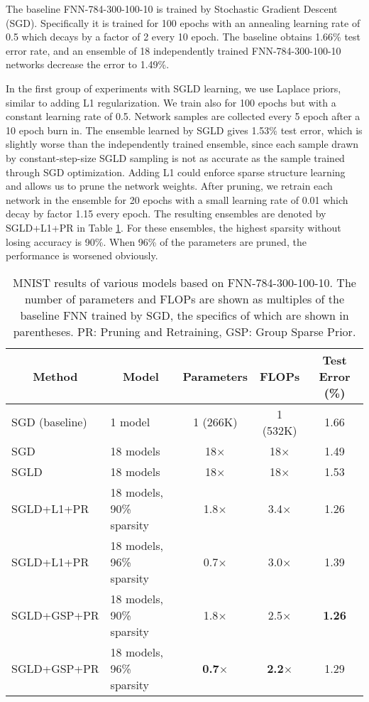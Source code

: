 \documentclass{article} %
\begin{document}
The baseline FNN-784-300-100-10 is trained by Stochastic Gradient Descent (SGD). Specifically it is trained for 100 epochs with an annealing learning rate of 0.5 which decays by a factor of 2 every 10 epoch. The baseline obtains 1.66\% test error rate, and an ensemble of 18 independently trained FNN-784-300-100-10 networks decrease the error to 1.49\%. 

In the first group of experiments with SGLD learning, we use Laplace priors, similar to adding L1 regularization.
We train also for 100 epochs but with a constant learning rate of 0.5. Network samples are collected every 5 epoch after a 10 epoch burn in. The ensemble learned by SGLD gives 1.53\% test error, which is slightly worse than the independently trained ensemble, since each sample drawn by constant-step-size SGLD sampling is not as accurate as the sample trained through SGD optimization.
Adding L1 could enforce sparse structure learning and allows us to prune the network weights. After pruning, we retrain each network in the ensemble for 20 epochs with a small learning rate of 0.01 which decay by factor 1.15 every epoch.
The resulting ensembles are denoted by SGLD+L1+PR in Table \ref{MNIST}.
For these ensembles, the highest sparsity without losing accuracy is 90\%. 
When 96\% of the parameters are pruned, the performance is worsened obviously.
\begin{table}[t]
	\caption{MNIST results of various models based on FNN-784-300-100-10.
		The number of parameters and FLOPs are shown as multiples of the baseline FNN trained by SGD, the specifics of which are shown in parentheses.
		PR: Pruning and Retraining, GSP: Group Sparse Prior.}
	\label{MNIST}
	\begin{center}
		\begin{tabular}{llccc}
			\toprule
			\multicolumn{1}{c}{Method}
			&\multicolumn{1}{c}{Model}
			&\multicolumn{1}{c}{Parameters}
			&\multicolumn{1}{c}{FLOPs}
			&\multicolumn{1}{c}{Test Error (\%)} \\
			\toprule
			SGD (baseline) &1 model &1 (266K) &1 (532K)  &1.66 \\
			SGD 		   &18 models &18$ \times $ &18$ \times $	&1.49  \\
			\midrule
			SGLD 	&18 models &18$ \times $ &18$ \times $	&1.53 \\
			SGLD+L1+PR	&18 models, 90\% sparsity	&1.8$ \times $ 	&3.4$ \times $	&1.26 \\
			SGLD+L1+PR	&18 models, 96\% sparsity	&0.7$ \times $ 	&3.0$ \times $	&1.39 \\
			\midrule
			SGLD+GSP+PR	&18 models, 90\% sparsity &1.8$ \times $ &2.5$ \times $	&\bf1.26 \\
			SGLD+GSP+PR	&18 models, 96\% sparsity	&\bf0.7$ \times $ &\bf2.2$ \times $ 	&1.29 \\
			\bottomrule
		\end{tabular}
	\end{center}
\end{table}
\end{document}
